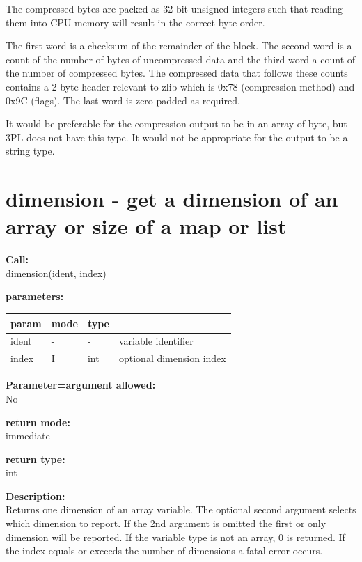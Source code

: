         The compressed bytes are packed as 32-bit unsigned integers such that
        reading them into CPU memory will result in the correct byte order.

        The first word is a checksum of the remainder of the block. The second
        word is a count of the number of bytes of uncompressed data and the
        third word a count of the number of compressed bytes. The compressed
        data that follows these counts contains a 2-byte header relevant to zlib
        which is 0x78 (compression method) and 0x9C (flags). The last word is
        zero-padded as required.

        It would be preferable for the compression output to be in an array of
        byte, but 3PL does not have this type. It would not be appropriate for
        the output to be a string type.


    \section{dimension - get a dimension of an array or size of a map or list}\label{sec:ifdimension}
        
        {\bf Call:} \\
        dimension(ident, index)
        
        {\bf parameters:} \\
        \begin{tabular}{| l | l | l | l |}
        \hline
        param  & mode & type & \\
        \hline \hline
        ident & - & -   & variable identifier       \\ \hline
        index & I & int & optional dimension index  \\ \hline
        \end{tabular}
        
        {\bf Parameter=argument allowed:} \\
        No
        
        {\bf return mode:} \\
        immediate

        {\bf return type:} \\
        int
        
        {\bf Description:} \\
        Returns one dimension of an array variable. The optional second
        argument selects which dimension to report. If the 2nd argument is
        omitted the first or only dimension will be reported. If the variable
        type is not an array, 0 is returned. If the index equals or exceeds
        the number of dimensions a fatal error occurs.
        
